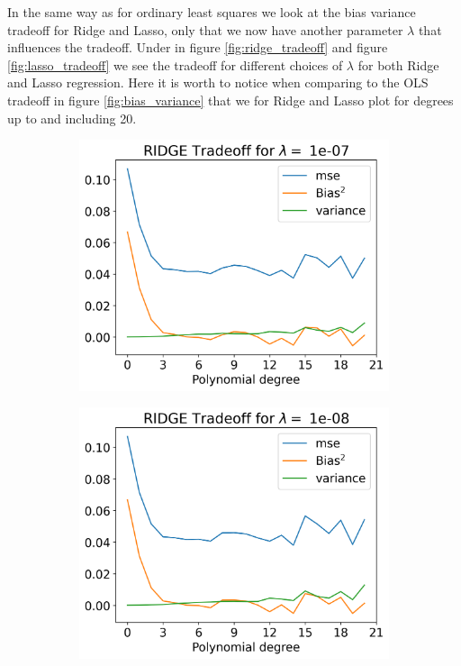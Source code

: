 \documentclass[12pt]{article}
\begin{document}
In the same way as for ordinary least squares we look at the bias variance tradeoff for Ridge and Lasso, only that we now have another parameter $\lambda$ that influences the tradeoff. Under in figure \ref{fig:ridge_tradeoff} and figure \ref{fig:lasso_tradeoff} we see the tradeoff for different choices of $\lambda$ for both Ridge and Lasso regression. Here it is worth to notice when comparing to the OLS tradeoff in figure \ref{fig:bias_variance} that we for Ridge and Lasso plot for degrees up to and including 20.
\begin{figure}[H]
  \begin{subfigure}{.5\textwidth}
    \centering
    \includegraphics[width=\textwidth]{../figures/tradeoff_RIDGE_1e-07_20.png}
    \caption{}
    \label{fig:l_1e-07}
  \end{subfigure}
  \begin{subfigure}{.5\textwidth}
    \centering
    \includegraphics[width=\textwidth]{../figures/tradeoff_RIDGE_1e-08_20.png}

\end{subfigure}
\end{figure}
\end{document}
